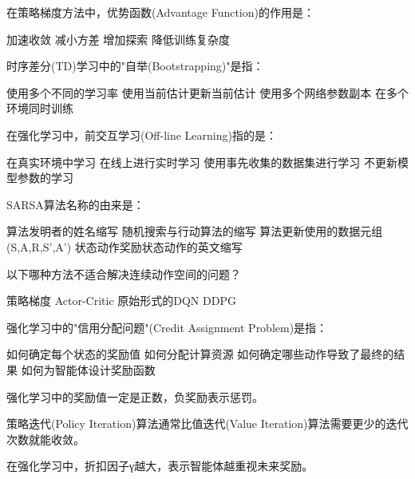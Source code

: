 \documentclass[zihao=5,answers]{BHCexam}
\begin{document}
\begin{questions}
\question 在策略梯度方法中，优势函数(Advantage Function)的作用是：
\begin{choices}
    \choice 加速收敛
    \CorrectChoice 减小方差
    \choice 增加探索
    \choice 降低训练复杂度
\end{choices}

\question 时序差分(TD)学习中的"自举(Bootstrapping)"是指：
\begin{choices}
    \choice 使用多个不同的学习率
    \CorrectChoice 使用当前估计更新当前估计
    \choice 使用多个网络参数副本
    \choice 在多个环境同时训练
\end{choices}

\question 在强化学习中，前交互学习(Off-line Learning)指的是：
\begin{choices}
    \choice 在真实环境中学习
    \choice 在线上进行实时学习
    \CorrectChoice 使用事先收集的数据集进行学习
    \choice 不更新模型参数的学习
\end{choices}

\question SARSA算法名称的由来是：
\begin{choices}
    \choice 算法发明者的姓名缩写
    \choice 随机搜索与行动算法的缩写
    \choice 算法更新使用的数据元组(S,A,R,S',A')
    \CorrectChoice 状态动作奖励状态动作的英文缩写
\end{choices}

\question 以下哪种方法不适合解决连续动作空间的问题？
\begin{choices}
    \choice 策略梯度
    \choice Actor-Critic
    \CorrectChoice 原始形式的DQN
    \choice DDPG
\end{choices}

\question 强化学习中的"信用分配问题"(Credit Assignment Problem)是指：
\begin{choices}
    \choice 如何确定每个状态的奖励值
    \choice 如何分配计算资源
    \CorrectChoice 如何确定哪些动作导致了最终的结果
    \choice 如何为智能体设计奖励函数
\end{choices}

\panduan

\question 强化学习中的奖励值一定是正数，负奖励表示惩罚。

\question 策略迭代(Policy Iteration)算法通常比值迭代(Value Iteration)算法需要更少的迭代次数就能收敛。

\question 在强化学习中，折扣因子γ越大，表示智能体越重视未来奖励。


\end{questions}
\end{document}
